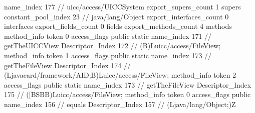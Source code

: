 {{{			name_index	177		// uicc/access/UICCSystem
			export_supers_count	1
			supers {
				constant_pool_index	23		// java/lang/Object
			}
			export_interfaces_count	0
			interfaces {
			}
			export_fields_count	0
			fields {
			}
			export_methods_count	4
			methods {
				method_info {
					token	0
					access_flags	public static
					name_index	171		// getTheUICCView
					Descriptor_Index	172		// (B)Luicc/access/FileView;
				}
				method_info {
					token	1
					access_flags	public static
					name_index	173		// getTheFileView
					Descriptor_Index	174		// (Ljavacard/framework/AID;B)Luicc/access/FileView;
				}
				method_info {
					token	2
					access_flags	public static
					name_index	173		// getTheFileView
					Descriptor_Index	175		// ([BSBB)Luicc/access/FileView;
				}
				method_info {
					token	0
					access_flags	public
					name_index	156		// equals
					Descriptor_Index	157		// (Ljava/lang/Object;)Z
				}
			}
		}
	}
}
